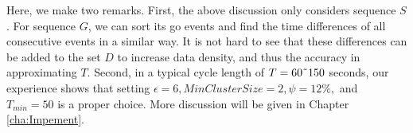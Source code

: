 \documentclass[final,oneside,onecolumn,12pt,a4paper]{book}%
\begin{document}
Here, we make two remarks. First, the above discussion only considers sequence
$S$. For sequence $G$, we can sort its go events and find the time differences
of all consecutive events in a similar way. It is not hard to see that these
differences can be added to the set $D$ to increase data density, and thus the
accuracy in approximating $T$. Second, in a typical cycle length of
$T=60\symbol{126}150$ seconds, our experience shows that setting
$\epsilon=6,MinClusterSize=2,\psi=12\%,$ and $T_{min}=50$ is a proper choice.
More discussion will be given in Chapter \ref{cha:Impement}.
\end{document}
